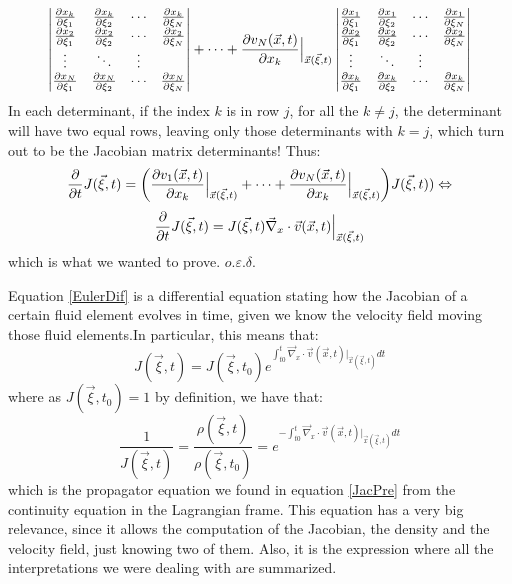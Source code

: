 \documentclass[11pt, a4paper]{article} %
\DeclareRobustCommand{\mybox}[2][gray!10]{%
\begin{tcolorbox}[   %
        left=0.2cm,
        right=0.2cm,
        top=0.15cm,
        bottom=0.15cm,
        colback=#1,
        colframe=#1,
        width=\dimexpr\textwidth\relax, 
        enlarge left by=0mm,
        boxsep=5pt,
        arc=0pt,outer arc=0pt,
        ]
        #2
\end{tcolorbox}
}
\begin{document}
{\begin{equation}
\begin{vmatrix}
\pdv{x_k}{\xi_{1}}&\pdv{x_k}{\xi_{2}} &\cdots &\pdv{x_k}{\xi_{N}}\\
\pdv{x_2}{\xi_{1}}&\pdv{x_2}{\xi_{2}} &\cdots &\pdv{x_2}{\xi_{N}}\\
\vdots & \ddots & \vdots\\
\pdv{x_N}{\xi_{1}}&\pdv{x_N}{\xi_{2}} &\cdots &\pdv{x_N}{\xi_{N}}
\end{vmatrix}+\cdots+
\pdv{v_N(\vec{x},t)}{x_k}\Big\rvert_{\vec{x}(\vec{\xi},t)} \begin{vmatrix}
\pdv{x_1}{\xi_{1}}&\pdv{x_1}{\xi_{2}} &\cdots &\pdv{x_1}{\xi_{N}}\\
\pdv{x_2}{\xi_{1}}&\pdv{x_2}{\xi_{2}} &\cdots &\pdv{x_2}{\xi_{N}}\\
\vdots & \ddots & \vdots\\
\pdv{x_k}{\xi_{1}}&\pdv{x_k}{\xi_{2}} &\cdots &\pdv{x_k}{\xi_{N}}
\end{vmatrix}
\end{equation}
In each determinant, if the index $k$ is in row $j$, for all the $k\neq j$, the determinant will have two equal rows, leaving only those determinants with $k=j$, which turn out to be the Jacobian matrix determinants! Thus:
\begin{equation}
\pdv{}{t}J(\vec{\xi},t)=\qty(\pdv{v_1(\vec{x},t)}{x_k}\Big\rvert_{\vec{x}(\vec{\xi},t)}+\cdots+\pdv{v_N(\vec{x},t)}{x_k}\Big\rvert_{\vec{x}(\vec{\xi},t)}) J(\vec{\xi},t))\Leftrightarrow
\end{equation}
\begin{equation}\label{EulerDif}
\pdv{}{t}J(\vec{\xi},t)=J(\vec{\xi},t)\vec{\nabla}_x\cdot\vec{v}(\vec{x},t)\Big\rvert_{\vec{x}(\vec{\xi},t)}
\end{equation}
which is what we wanted to prove. $o.\varepsilon.\delta$.}
\mybox{
Equation \eqref{EulerDif} is a differential equation stating how the Jacobian of a certain fluid element evolves in time, given we know the velocity field moving those fluid elements.In particular, this means that:\vspace{-0.2cm}
\begin{equation}
J(\vec{\xi},t)=J(\vec{\xi},t_0)e^{\int_{t0}^t \vec{\nabla}_x\cdot\vec{v}(\vec{x},t)\Big\rvert_{\vec{x}(\vec{\xi},t)}dt}
\end{equation}
where as $J(\vec{\xi},t_0)=1$ by definition, we have that:\vspace{-0.2cm}
\begin{equation}
\frac{1}{J(\vec{\xi},t)}=\frac{\rho(\vec{\xi},t)}{\rho(\vec{\xi},t_0)}=e^{-\int_{t0}^t \vec{\nabla}_x\cdot\vec{v}(\vec{x},t)\Big\rvert_{\vec{x}(\vec{\xi},t)}dt}
\end{equation}
which is the propagator equation we found in equation \eqref{JacPre} from the continuity equation in the Lagrangian frame. This equation has a very big relevance, since it allows the computation of the Jacobian, the density and the velocity field, just knowing two of them. Also, it is the expression where all the interpretations we were dealing with are summarized.}
\end{document}
